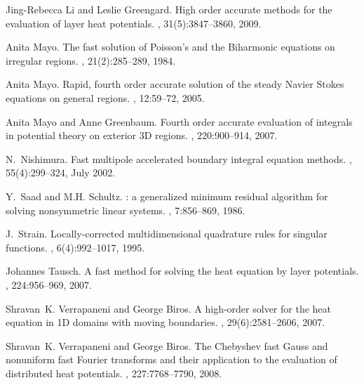 \documentclass[preprint,12pt]{elsarticle}
\begin{document}
\begin{thebibliography}{10}
Jing-Rebecca Li and Leslie Greengard.
\newblock High order accurate methods for the evaluation of layer heat
  potentials.
, 31(5):3847--3860, 2009.

Anita Mayo.
\newblock The fast solution of Poisson's and the Biharmonic equations on
  irregular regions.
, 21(2):285--289, 1984.

Anita Mayo.
\newblock Rapid, fourth order accurate solution of the steady Navier Stokes
  equations on general regions.
,
  12:59--72, 2005.

Anita Mayo and Anne Greenbaum.
\newblock Fourth order accurate evaluation of integrals in potential theory on
  exterior 3D regions.
, 220:900--914, 2007.

N.~Nishimura.
\newblock Fast multipole accelerated boundary integral equation methods.
, 55(4):299--324, July 2002.

Y.~Saad and M.H. Schultz.
: a generalized minimum residual algorithm for solving
  nonsymmetric linear systems.
, 7:856--869, 1986.

J.~Strain.
\newblock Locally-corrected multidimensional quadrature rules for singular
  functions.
, 6(4):992--1017, 1995.

Johannes Tausch.
\newblock A fast method for solving the heat equation by layer potentials.
, 224:956--969, 2007.

Shravan~K. Verrapaneni and George Biros.
\newblock A high-order solver for the heat equation in 1D domains with moving
  boundaries.
, 29(6):2581--2606, 2007.

Shravan~K. Verrapaneni and George Biros.
\newblock The Chebyshev fast Gauss and nonuniform fast Fourier transforms and
  their application to the evaluation of distributed heat potentials.
, 227:7768--7790, 2008.

\end{thebibliography}
%
\end{document}
